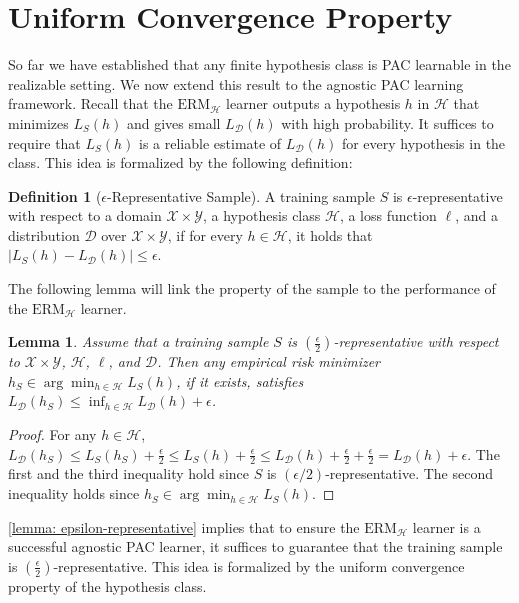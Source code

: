 \documentclass[openany, amssymb, psamsfonts]{amsart}
\newtheorem{lem}{Lemma}[section]
\theoremstyle{definition}
\newtheorem{defn}{Definition}[section]
\numberwithin{equation}{section}
\begin{document}
\section{Uniform Convergence Property}

So far we have established that any finite hypothesis class is PAC learnable in the realizable setting. We now extend this result to the agnostic PAC learning framework. Recall that the $\mathrm{ERM}_\mathcal{H}$ learner outputs a hypothesis $h$ in $\mathcal{H}$ that minimizes $L_S(h)$ and gives small $L_\mathcal{D}(h)$ with high probability. It suffices to require that $L_S(h)$ is a reliable estimate of $L_\mathcal{D}(h)$ for every hypothesis in the class. This idea is formalized by the following definition:

\begin{defn}[$\epsilon$-Representative Sample] \label{definition: epsilon-representative}
A training sample $S$ is $\epsilon$-representative with respect to a domain $\mathcal{X} \times \mathcal{Y}$, a hypothesis class $\mathcal{H}$, a loss function $\ell$, and a distribution $\mathcal{D}$ over $\mathcal{X} \times \mathcal{Y}$, if for every $h \in \mathcal{H}$, it holds that $|L_S(h) - L_{\mathcal{D}}(h)| \leq \epsilon.$
\end{defn}

The following lemma will link the property of the sample to the performance of the $\mathrm{ERM}_\mathcal{H}$ learner.

\begin{lem}\label{lemma: epsilon-representative}
Assume that a training sample $S$ is $(\frac{\epsilon}{2})$-representative with respect to $\mathcal{X} \times \mathcal{Y}$, $\mathcal{H}$, $\ell$, and $\mathcal{D}$. Then any empirical risk minimizer $h_S \in \arg\min_{h \in \mathcal{H}} L_S(h)$, if it exists, satisfies $L_{\mathcal{D}}(h_S) \leq \inf_{h \in \mathcal{H}} L_{\mathcal{D}}(h) + \epsilon$.
\end{lem}
\begin{proof}
For any $h \in \mathcal{H}$, $L_{\mathcal{D}}(h_S) \leq L_S(h_S) + \frac{\epsilon}{2} \leq L_S(h) + \frac{\epsilon}{2} \leq L_{\mathcal{D}}(h) + \frac{\epsilon}{2} + \frac{\epsilon}{2} = L_{\mathcal{D}}(h) + \epsilon$.
The first and the third inequality hold since $S$ is $(\epsilon/2)$-representative. The second inequality holds since $h_S\in \arg\min_{h \in \mathcal{H}} L_S(h)$.
\end{proof}

\autoref{lemma: epsilon-representative} implies that to ensure the $\mathrm{ERM}_\mathcal{H}$ learner is a successful agnostic PAC learner, it suffices to guarantee that the training sample is $(\frac{\epsilon}{2})$-representative. This idea is formalized by the uniform convergence property of the hypothesis class.
\end{document}
